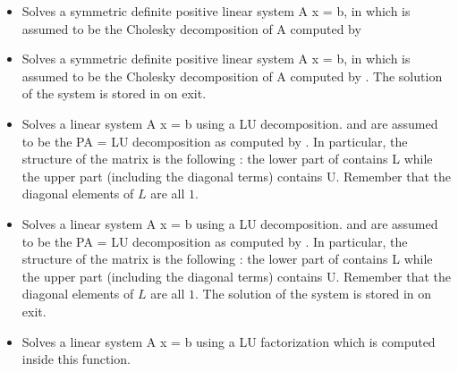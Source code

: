 \begin{itemize}
\item {} 
  \sshortdescribe Solves a symmetric definite positive linear system A x = b, 
  in which  is assumed to be the Cholesky decomposition of A
  computed by 

\item {} 
  \sshortdescribe Solves a symmetric definite positive linear system A x = b, 
  in which  is assumed to be the Cholesky decomposition of A
  computed by . The solution of the system is stored in
   on exit.

\item {} 
  \sshortdescribe Solves a linear system A x = b using a LU decomposition.
   and  are assumed to be the PA = LU decomposition as computed
  by . In particular, the structure of the matrix 
  is the following : the lower part of  contains L while the upper part
  (including the diagonal terms) contains U. Remember that the diagonal
  elements of $L$ are all $1$.

\item {} 
  \sshortdescribe Solves a linear system A x = b using a LU decomposition.
   and  are assumed to be the PA = LU decomposition as computed
  by . In particular, the structure of the matrix 
  is the following : the lower part of  contains L while the upper part
  (including the diagonal terms) contains U. Remember that the diagonal
  elements of $L$ are all $1$. The solution of the system is stored in 
  on exit.
  
\item {} 
  \sshortdescribe Solves a linear system A x = b using a LU factorization
  which is computed inside this function.


\end{itemize}
